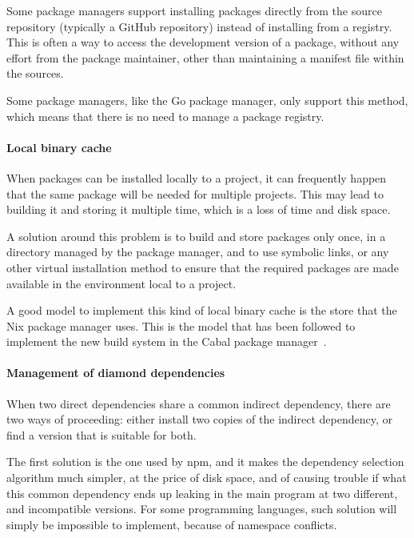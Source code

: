 Some package managers support installing packages directly from the source repository (typically a GitHub repository) instead of installing from a registry.
This is often a way to access the development version of a package, without any effort from the package maintainer, other than maintaining a manifest file within the sources.

Some package managers, like the Go package manager, only support this method, which means that there is no need to manage a package registry.

\paragraph{Local binary cache}

When packages can be installed locally to a project, it can frequently happen that the same package will be needed for multiple projects.
This may lead to building it and storing it multiple time, which is a loss of time and disk space.

A solution around this problem is to build and store packages only once, in a directory managed by the package manager, and to use symbolic links, or any other virtual installation method to ensure that the required packages are made available in the environment local to a project.

A good model to implement this kind of local binary cache is the store that the Nix package manager uses.
This is the model that has been followed to implement the new build system in the Cabal package manager~\cite[Chapter 5 ``Nix-style Local Builds'']{cabal_manual}.

\paragraph{Management of diamond dependencies}

When two direct dependencies share a common indirect dependency, there are two ways of proceeding: either install two copies of the indirect dependency, or find a version that is suitable for both.

The first solution is the one used by npm, and it makes the dependency selection algorithm much simpler, at the price of disk space, and of causing trouble if what this common dependency ends up leaking in the main program at two different, and incompatible versions.
For some programming languages, such solution will simply be impossible to implement, because of namespace conflicts.

